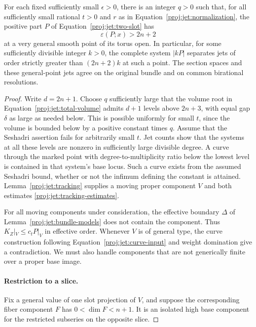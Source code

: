\begin{proposition}\label{proj:prop:large-seshadri}
For each fixed sufficiently small \(\epsilon>0\), there is an integer
\(q>0\) such that, for all sufficiently small rational \(t>0\) and
\(r\) as in Equation~\eqref{proj:jet:normalization}, the positive part
\(P\) of Equation~\eqref{proj:jet:two-slot} has
\[
 \varepsilon(P;x)>2n+2
\]
at a very general smooth point of its torus open.
In particular, for some sufficiently divisible integer \(k>0\),
the complete system \(|kP|\) separates jets of order strictly
greater than \((2n+2)k\) at such a point.
The section spaces and these general-point jets agree on the
original bundle and on common birational resolutions.
\end{proposition}

\begin{proof}
Write \(d=2n+1\).  Choose \(q\) sufficiently large that the volume
root in Equation~\eqref{proj:jet:total-volume} admits \(d+1\) levels above
\(2n+3\), with equal gap \(\delta\) as large as needed below.
This is possible uniformly for small \(t\), since the volume is
bounded below by a positive constant times \(q\).
Assume that the Seshadri assertion fails for arbitrarily small \(t\).
Jet counts show that the systems at all these levels are nonzero
in sufficiently large divisible degree.  A curve through the marked
point with degree-to-multiplicity ratio below the lowest level is
contained in that system's base locus.  Such a curve exists from
the assumed Seshadri bound, whether or not the infimum defining
the constant is attained.  Lemma~\ref{proj:jet:tracking} supplies a
moving proper component \(V\) and both estimates
\eqref{proj:jet:tracking-estimates}.

For all moving components under consideration, the effective
boundary \(\Delta\) of Lemma~\ref{proj:jet:bundle-models} does not contain
the component.  Thus \(K_Z|_V\le c_tP|_V\) in effective order.
Whenever \(V\) is of general type, the curve construction following
Equation~\eqref{proj:jet:curve-input} and weight domination give a
contradiction.  We must also handle components that are not
generically finite over a proper base image.

\paragraph{Restriction to a slice.}
Fix a general value of one slot projection of \(V\), and suppose
the corresponding fiber component \(F\) has
\(0<\dim F<n+1\).  It is an isolated high base component for the
restricted subseries on the opposite slice.


\end{proof}
